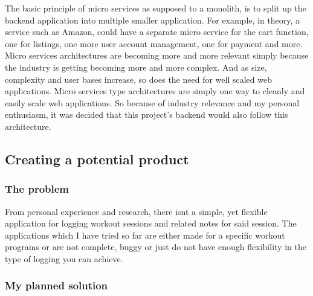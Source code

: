 \documentclass[twocolumn]{article}
\begin{document}
The basic principle of micro services as supposed to a monolith, is to split up the backend application into multiple smaller application. For example, in theory, a service such as Amazon, could have a separate micro service for the cart function, one for listings, one more user account management, one for payment and more.
Micro services architectures are becoming more and more relevant simply because the industry is getting becoming more and more complex. And as size, complexity and user bases increase, so does the need for well scaled web applications. Micro services type architectures are simply one way to cleanly and easily scale web applications. So because of industry relevance and my personal enthusiasm, it was decided that this project's backend would also follow this architecture. 

\subsection{Creating a potential product}
\vspace{-1ex}


\subsubsection{The problem}
\vspace{-1ex}

From personal experience and research, there isnt a simple, yet flexible application for logging workout sessions and related notes for said session. The applications which I have tried so far are either made for a specific workout programs or are not complete, buggy or just do not have enough flexibility in the type of logging you can achieve.


\subsubsection{My planned solution}
\vspace{-1ex}
\end{document}
